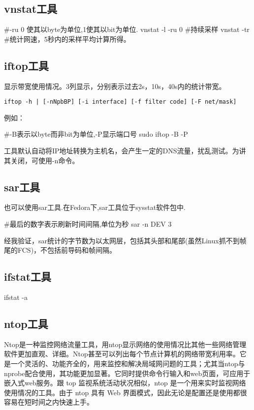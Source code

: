 \subsection{vnstat工具}
\begin{shellcmd}
#-ru 0 使其以byte为单位,1使其以bit为单位.
vnstat -l -ru 0 #持续采样 
vnstat -tr #统计网速，5秒内的采样平均计算所得。
\end{shellcmd}

\subsection{iftop工具}
显示带宽使用情况。3列显示，分别表示过去2s，10s，40s内的统计带宽。
\begin{verbatim}
iftop -h | [-nNpbBP] [-i interface] [-f filter code] [-F net/mask]
\end{verbatim}
例如：
\begin{shellcmd}
#-B表示以byte而非bit为单位,-P显示端口号
sudo iftop -B -P 
\end{shellcmd}
工具默认自动将IP地址转换为主机名，会产生一定的DNS流量，扰乱测试。为讲其关闭，可使用-n命令。

\subsection{sar工具}
也可以使用sar工具.在Fedora下,sar工具位于sysstat软件包中.
\begin{shellcmd}
#最后的数字表示刷新时间间隔,单位为秒
sar -n DEV 3 
\end{shellcmd}

经我验证，sar统计的字节数为以太网层，包括其头部和尾部(虽然Linux抓不到帧尾的FCS)，不包括前导码和帧间隔。

\subsection{ifstat工具}
\begin{shellcmd}
ifstat -a
\end{shellcmd}

\subsection{ntop工具}
Ntop是一种监控网络流量工具，用ntop显示网络的使用情况比其他一些网络管理软件更加直观、详细。Ntop甚至可以列出每个节点计算机的网络带宽利用率。它是一个灵活的、功能齐全的，用来监控和解决局域网问题的工具；尤其当ntop与nprobe配合使用，其功能更加显著。它同时提供命令行输入和web页面，可应用于嵌入式web服务。跟 top 监视系统活动状况相似，ntop 是一个用来实时监视网络使用情况的工具。由于 ntop 具有 Web 界面模式，因此无论是配置还是使用都很容易在短时间之内快速上手。

